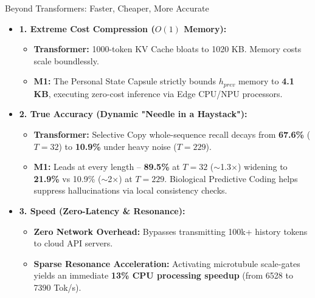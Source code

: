 ﻿\documentclass[aspectratio=169, 10pt]{beamer}
\begin{document}
\begin{frame}[allowframebreaks]{Beyond Transformers: Faster, Cheaper, More Accurate}
\small
\begin{itemize}\itemsep=0.3em
    \item \textbf{1. Extreme Cost Compression ($O(1)$ Memory):}
    \begin{itemize}
        \item \textbf{Transformer:} 1000-token KV Cache bloats to 1020 KB. Memory costs scale boundlessly.
        \item \textbf{M1:} The Personal State Capsule strictly bounds $h_{prev}$ memory to \textbf{4.1 KB}, executing zero-cost inference via Edge CPU/NPU processors.
    \end{itemize}
    \vspace{0.5em}
    \item \textbf{2. True Accuracy (Dynamic "Needle in a Haystack"):}
    \begin{itemize}
        \item \textbf{Transformer:} Selective Copy whole-sequence recall decays from \textbf{67.6\%} ($T=32$) to \textbf{10.9\%} under heavy noise ($T=229$).
        \item \textbf{M1:} Leads at every length -- \textbf{89.5\%} at $T=32$ ($\sim$1.3$\times$) widening to \textbf{21.9\%} vs 10.9\% ($\sim$2$\times$) at $T=229$. Biological Predictive Coding helps suppress hallucinations via local consistency checks.
    \end{itemize}
    \vspace{0.5em}
    \item \textbf{3. Speed (Zero-Latency \& Resonance):}
    \begin{itemize}
        \item \textbf{Zero Network Overhead:} Bypasses transmitting 100k+ history tokens to cloud API servers.
        \item \textbf{Sparse Resonance Acceleration:} Activating microtubule scale-gates yields an immediate \textbf{13\% CPU processing speedup} (from 6528 to 7390 Tok/s).
    \end{itemize}
\end{itemize}
\end{frame}
\end{document}
